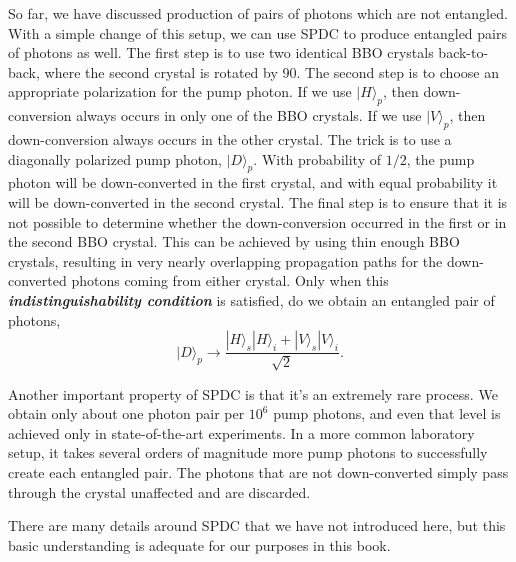 
So far, we have discussed production of pairs of photons which are not entangled.
With a simple change of this setup, we can use SPDC to produce entangled pairs of photons as well.
The first step is to use two identical BBO crystals back-to-back, where the second crystal is rotated by 90\degree.
The second step is to choose an appropriate polarization for the pump photon.
If we use $|H\rangle_p$, then down-conversion always occurs in only one of the BBO crystals.
If we use $|V\rangle_p$, then down-conversion always occurs in the other crystal.
The trick is to use a diagonally polarized pump photon, $|D\rangle_p$.
With probability of $1/2$, the pump photon will be down-converted in the first crystal, and with equal probability it will be down-converted in the second crystal.
The final step is to ensure that it is not possible to determine whether the down-conversion occurred in the first or in the second BBO crystal.
This can be achieved by using thin enough BBO crystals, resulting in very nearly overlapping propagation paths for the down-converted photons coming from either crystal.
Only when this \textbf{\emph{indistinguishability condition}} is satisfied, do we obtain an entangled pair of photons,
\begin{equation}
    |D\rangle_p \rightarrow \frac{|H\rangle_s|H\rangle_i + |V\rangle_s|V\rangle_i}{\sqrt{2}}.
\end{equation}

Another important property of SPDC is that it's an extremely rare process.  We obtain only about one photon pair per $10^6$ pump photons, and even that level is achieved only in state-of-the-art experiments. In a more common laboratory setup, it takes several orders of magnitude more pump photons to successfully create each entangled pair.  The photons that are not down-converted simply pass through the crystal unaffected and are discarded.

There are many details around SPDC that we have not introduced here, but this basic understanding is adequate for our purposes in this book.

